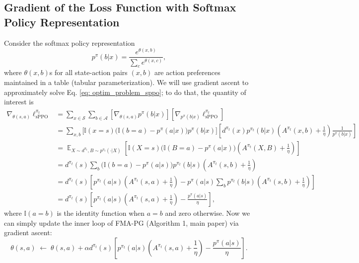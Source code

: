 \documentclass[a4paper, 10pt]{article}
\DeclareMathOperator{\E}{\mathbb{E}}
\begin{document}
\subsection{Gradient of the Loss Function with Softmax Policy Representation}
Consider the softmax policy representation
\begin{equation}
  p^\pi(b | x) = \frac{e^{\theta(x, b)}}{\sum_c e^{\theta(x, c)}}, \label{eq: softmax}
\end{equation}
where $\theta(x, b)$s for all state-action pairs $(x, b)$ are action preferences maintained in a table (tabular parameterization). We will use gradient ascent to approximately solve Eq. \ref{eq: optim_problem_sppo}; to do that, the quantity of interest is
\begin{align}
  \nabla_{\theta(s, a)} \ell^{\pi_t}_{\text{sPPO}} &= \sum_{x \in \mathcal{S}} \sum_{b \in \mathcal{A}} \left[ \nabla_{\theta(s, a)} p^\pi(b | x) \right] \left[ \nabla_{p^\pi(b | x)} \ell^{\pi_t}_{\text{sPPO}} \right] \tag*{(using total derivative)} \\
  &= \sum_{x, b} \Big[ \mathbb{I}(x = s) \Big( \mathbb{I}(b = a) - p^\pi(a | x) \Big) p^\pi(b | x) \Big] \left[ d^{\pi_t}(x) p^{\pi_t}(b|x) \left( A^{\pi_t}(x, b) + \frac{1}{\eta} \right) \frac{1}{p^\pi(b|x)} \right] \nonumber \\
  &= \E_{X \sim d^{\pi_t}, B \sim p^{\pi_t}(\cdot | X)} \left[ \mathbb{I}(X = s) \Big( \mathbb{I}(B = a) - p^\pi(a | x) \Big) \left( A^{\pi_t}(X, B) + \frac{1}{\eta} \right) \right] \\
  &= d^{\pi_t}(s) \sum_b \Big( \mathbb{I}(b = a) - p^\pi(a | s) \Big) p^{\pi_t}(b|s) \left( A^{\pi_t}(s, b) + \frac{1}{\eta} \right) \nonumber \\
  &= d^{\pi_t}(s) \left[ p^{\pi_t}(a|s) \left( A^{\pi_t}(s, a) + \frac{1}{\eta} \right) - p^\pi(a | s) \sum_b p^{\pi_t}(b|s) \left(A^{\pi_t}(s, b) + \frac{1}{\eta} \right) \right] \nonumber \\
  &= d^{\pi_t}(s) \left[ p^{\pi_t}(a|s) \left( A^{\pi_t}(s, a) + \frac{1}{\eta} \right) - \frac{p^\pi(a | s)}{\eta} \right], \nonumber
\end{align}
where $\mathbb{I}(a = b)$ is the identity function when $a = b$ and zero otherwise. Now we can simply update the inner loop of FMA-PG (Algorithm 1, main paper) via gradient ascent:
\begin{equation}
  \theta(s, a) \; \leftarrow \; \theta(s, a) + \alpha d^{\pi_t}(s) \left[ p^{\pi_t}(a|s) \left( A^{\pi_t}(s, a) + \frac{1}{\eta} \right) - \frac{p^\pi(a | s)}{\eta} \right].
\end{equation}
\end{document}
